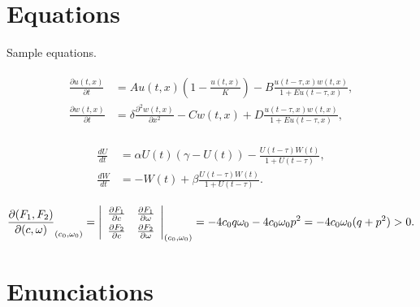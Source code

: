 \documentclass{article}
\begin{document}
\section{Equations}

Sample equations.

\begin{align}\label{1.1}
\begin{split}
\frac{\partial u(t,x)}{\partial t} &= Au(t,x) \left(1-\frac{u(t,x)}{K}\right)-B\frac{u(t-\tau,x) w(t,x)}{1+Eu(t-\tau,x)},\\
\frac{\partial w(t,x)}{\partial t} &=\delta \frac{\partial^2w(t,x)}{\partial x^2}-Cw(t,x)+D\frac{u(t-\tau,x)w(t,x)}{1+Eu(t-\tau,x)},
\end{split}
\end{align}

\begin{align}\label{1.2}
\begin{split}
\frac{dU}{dt} &=\alpha U(t)(\gamma -U(t))-\frac{U(t-\tau)W(t)}{1+U(t-\tau)},\\
\frac{dW}{dt} &=-W(t)+\beta\frac{U(t-\tau)W(t)}{1+U(t-\tau)}.
\end{split}
\end{align}

\[
\frac{\partial(F_1,F_2)}{\partial(c,\omega)}_{(c_0,\omega_0)} = \left|
\begin{array}{ll}
\frac{\partial F_1}{\partial c} &\frac{\partial F_1}{\partial \omega} \\\noalign{\vskip3pt}
\frac{\partial F_2}{\partial c}&\frac{\partial F_2}{\partial \omega}
\end{array}\right|_{(c_0,\omega_0)}=-4c_0q\omega_0 -4c_0\omega_0p^2 =-4c_0\omega_0(q+p^2)>0.
\]

\section{Enunciations}



\end{document}
